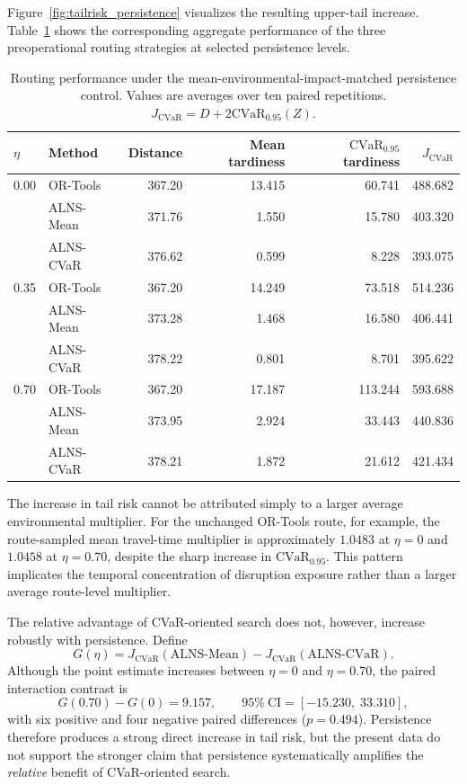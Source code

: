 \documentclass[preprint,12pt]{elsarticle}
\newcommand{\CVaR}{\mathrm{CVaR}}
\newcommand{\1}{\mathbf{1}}
\begin{document}
Figure~\ref{fig:tailrisk_persistence} visualizes the resulting upper-tail increase.
Table~\ref{tab:persistence_routing} shows the corresponding aggregate
performance of the three preoperational routing strategies at selected
persistence levels.

\begin{table}[t]
	\centering
	\caption{Routing performance under the mean-environmental-impact-matched
		persistence control. Values are averages over ten paired repetitions.
		$J_{\mathrm{CVaR}}=D+2\CVaR_{0.95}(Z)$.}
	\label{tab:persistence_routing}
		\footnotesize
	\begin{tabular}{llrrrr}
		\toprule
		$\eta$ &
		Method &
		Distance &
		Mean tardiness &
		$\CVaR_{0.95}$ tardiness &
		$J_{\mathrm{CVaR}}$ \\
		\midrule
		0.00 &
		OR-Tools &
		367.20 & 13.415 & 60.741 & 488.682 \\
		&
		ALNS-Mean &
		371.76 & 1.550 & 15.780 & 403.320 \\
		&
		ALNS-CVaR &
		376.62 & 0.599 & 8.228 & 393.075 \\
		\midrule
		0.35 &
		OR-Tools &
		367.20 & 14.249 & 73.518 & 514.236 \\
		&
		ALNS-Mean &
		373.28 & 1.468 & 16.580 & 406.441 \\
		&
		ALNS-CVaR &
		378.22 & 0.801 & 8.701 & 395.622 \\
		\midrule
		0.70 &
		OR-Tools &
		367.20 & 17.187 & 113.244 & 593.688 \\
		&
		ALNS-Mean &
		373.95 & 2.924 & 33.443 & 440.836 \\
		&
		ALNS-CVaR &
		378.21 & 1.872 & 21.612 & 421.434 \\
		\bottomrule
	\end{tabular}
\end{table}

The increase in tail risk cannot be attributed simply to a larger average
environmental multiplier. For the unchanged OR-Tools route, for example, the
route-sampled mean travel-time multiplier is approximately $1.0483$ at
$\eta=0$ and $1.0458$ at $\eta=0.70$, despite the sharp increase in
$\CVaR_{0.95}$. This pattern implicates the temporal concentration of
disruption exposure rather than a larger average route-level multiplier.

The relative advantage of CVaR-oriented search does not, however, increase
robustly with persistence. Define
\[
G(\eta)
=
J_{\mathrm{CVaR}}(\text{ALNS-Mean})
-
J_{\mathrm{CVaR}}(\text{ALNS-CVaR}).
\]
Although the point estimate increases between $\eta=0$ and $\eta=0.70$,
the paired interaction contrast is
\begin{equation}
	G(0.70)-G(0)
	=
	9.157,
	\qquad
	95\%~\mathrm{CI}
	=
	[-15.230,\;33.310],
\end{equation}
with six positive and four negative paired differences
($p=0.494$).
Persistence therefore produces a strong direct increase in tail risk, but the
present data do not support the stronger claim that persistence systematically
amplifies the \emph{relative} benefit of CVaR-oriented search.
\end{document}
